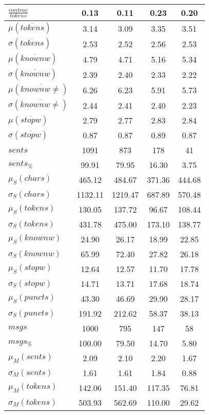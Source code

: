 \begin{table}[h!]
\begin{center}
\begin{tabular}{| l || c | c | c | c |}
$\frac{contrac}{tokens}$ & 0.13  & 0.11  & 0.23  & 0.20 \\\hline\hline
$\mu(\overline{tokens})$ & 3.14  & 3.09  & 3.35  & 3.51 \\
$\sigma(\overline{tokens})$ & 2.53  & 2.52  & 2.56  & 2.53 \\\hline
$\mu(\overline{knownw})$ & 4.79  & 4.71  & 5.16  & 5.34 \\
$\sigma(\overline{knownw})$ & 2.39  & 2.40  & 2.33  & 2.22 \\\hline
$\mu(\overline{knownw \neq})$ & 6.26  & 6.23  & 5.91  & 5.73 \\
$\sigma(\overline{knownw \neq})$ & 2.44  & 2.41  & 2.40  & 2.23 \\\hline
$\mu(\overline{stopw})$ & 2.79  & 2.77  & 2.83  & 2.84 \\
$\sigma(\overline{stopw})$ & 0.87  & 0.87  & 0.89  & 0.87 \\\hline\hline
$sents$ & 1091  & 873  & 178  & 41 \\
$sents_{\%}$ & 99.91  & 79.95  & 16.30  & 3.75 \\\hline
$\mu_S(chars)$ & 465.12  & 484.67  & 371.36  & 444.68 \\
$\sigma_S(chars)$ & 1132.11  & 1219.47  & 687.89  & 570.48 \\\hline
$\mu_S(tokens)$ & 130.05  & 137.72  & 96.67  & 108.44 \\
$\sigma_S(tokens)$ & 431.78  & 475.00  & 173.10  & 138.77 \\\hline
$\mu_S(knownw)$ & 24.90  & 26.17  & 18.99  & 22.85 \\
$\sigma_S(knownw)$ & 65.99  & 72.40  & 27.82  & 26.18 \\\hline
$\mu_S(stopw)$ & 12.64  & 12.57  & 11.70  & 17.78 \\
$\sigma_S(stopw)$ & 14.71  & 13.71  & 17.68  & 18.74 \\\hline
$\mu_S(puncts)$ & 43.30  & 46.69  & 29.90  & 28.17 \\
$\sigma_S(puncts)$ & 191.92  & 212.62  & 58.37  & 38.13 \\\hline\hline
$msgs$ & 1000  & 795  & 147  & 58 \\
$msgs_{\%}$ & 100.00  & 79.50  & 14.70  & 5.80 \\\hline
$\mu_M(sents)$ & 2.09  & 2.10  & 2.20  & 1.67 \\
$\sigma_M(sents)$ & 1.61  & 1.61  & 1.84  & 0.88 \\\hline
$\mu_M(tokens)$ & 142.06  & 151.40  & 117.35  & 76.81 \\
$\sigma_M(tokens)$ & 503.93  & 562.69  & 110.00  & 29.62 \\\hline

\end{tabular}
\end{center}
\end{table}
